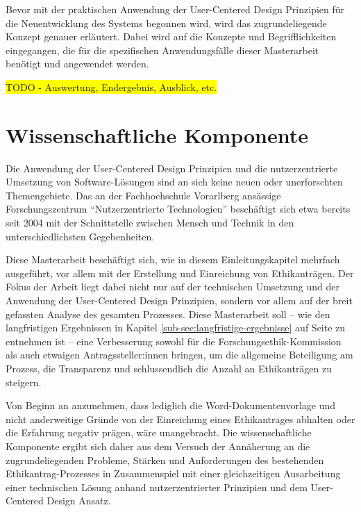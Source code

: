 \documentclass[a4paper,12pt,twoside]{scrreprt}
\begin{document}
Bevor mit der praktischen Anwendung der User-Centered Design Prinzipien für die Neuentwicklung des Systems begonnen wird, wird das zugrundeliegende Konzept genauer erläutert. Dabei wird auf die Konzepte und Begrifflichkeiten eingegangen, die für die spezifischen Anwendungsfälle dieser Masterarbeit benötigt und angewendet werden.

\colorbox{yellow}{TODO - Auswertung, Endergebnis, Ausblick, etc.}

\section{Wissenschaftliche Komponente}
\label{sec:wissenschaftliche-komponente}

Die Anwendung der User-Centered Design Prinzipien und die nutzerzentrierte Umsetzung von Software-Lösungen sind an sich keine neuen oder unerforschten Themengebiete. Das an der Fachhochschule Vorarlberg ansässige Forschungszentrum \enquote{Nutzerzentrierte Technologien} beschäftigt sich etwa bereits seit 2004 mit der Schnittstelle zwischen Mensch und Technik in den unterschiedlichsten Gegebenheiten. \cite{fachhochschule_vorarlberg_gmbh_nutzerzentrierte_2021}

Diese Masterarbeit beschäftigt sich, wie in diesem Einleitungskapitel mehrfach ausgeführt, vor allem mit der Erstellung und Einreichung von Ethikanträgen. Der Fokus der Arbeit liegt dabei nicht nur auf der technischen Umsetzung und der Anwendung der User-Centered Design Prinzipien, sondern vor allem auf der breit gefassten Analyse des gesamten Prozesses. Diese Masterarbeit soll -- wie den langfristigen Ergebnissen in Kapitel \ref{sub-sec:langfristige-ergebnisse} auf Seite \pageref{sub-sec:langfristige-ergebnisse} zu entnehmen ist -- eine Verbesserung sowohl für die Forschungsethik-Kommission als auch etwaigen Antragssteller:innen bringen, um die allgemeine Beteiligung am Prozess, die Transparenz und schlussendlich die Anzahl an Ethikanträgen zu steigern.

Von Beginn an anzunehmen, dass lediglich die Word-Dokumentenvorlage und nicht anderweitige Gründe von der Einreichung eines Ethikantrages abhalten oder die Erfahrung negativ prägen, wäre unangebracht. Die wissenschaftliche Komponente ergibt sich daher aus dem Versuch der Annäherung an die zugrundeliegenden Probleme, Stärken und Anforderungen des bestehenden Ethikantrag-Prozesses in Zusammenspiel mit einer gleichzeitigen Ausarbeitung einer technischen Lösung anhand nutzerzentrierter Prinzipien und dem User-Centered Design Ansatz.
\end{document}
